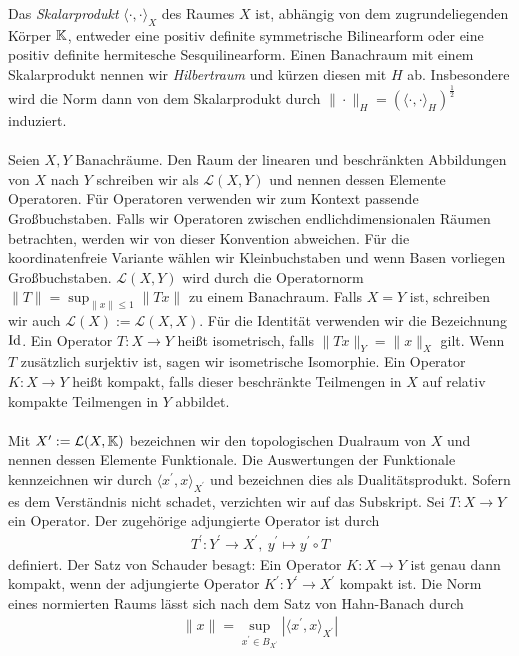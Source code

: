 Das \textit{Skalarprodukt} $ \langle \cdot, \cdot \rangle_X $ des Raumes $ X $ ist, abhängig von dem zugrundeliegenden Körper $ \mathbb{K} $, entweder eine positiv definite symmetrische Bilinearform oder eine positiv definite hermitesche Sesquilinearform.
Einen Banachraum mit einem Skalarprodukt nennen wir \textit{Hilbertraum} und kürzen diesen mit $ H $ ab. Insbesondere wird die Norm dann von dem Skalarprodukt durch $ \| \cdot \|_H = (\langle \cdot , \cdot \rangle_H)^\frac{1}{2} $ induziert.\\
\\
Seien $ X,Y $ Banachräume.
Den Raum der linearen und beschränkten Abbildungen von $ X $ nach $ Y $ schreiben wir als $ \mathcal{L}(X,Y) $ und nennen dessen Elemente Operatoren.
Für Operatoren verwenden wir zum Kontext passende Großbuchstaben.
Falls wir Operatoren zwischen endlichdimensionalen Räumen betrachten, werden wir von dieser Konvention abweichen. Für die koordinatenfreie Variante wählen wir Kleinbuchstaben und wenn Basen vorliegen Großbuchstaben.
$ \mathcal{L}(X,Y) $ wird durch die Operatornorm $ \|T\| = \sup_{\|x\| \leq 1} \|Tx\| $ zu einem Banachraum.
Falls $ X=Y $ ist, schreiben wir auch $ \mathcal{L}(X) := \mathcal{L}(X,X) $.
Für die Identität verwenden wir die Bezeichnung $ \operatorname{Id} $.
Ein Operator $ T: X \to Y $ heißt isometrisch, falls $ \|Tx\|_Y = \|x \|_X $ gilt.
Wenn $ T $ zusätzlich surjektiv ist, sagen wir isometrische Isomorphie.
Ein Operator $ K : X \to Y $ heißt kompakt, falls dieser beschränkte Teilmengen in $ X $ auf relativ kompakte Teilmengen in $ Y $ abbildet.\\
\\
Mit $ X^\prime := \mathcal{L}(X, \mathbb{K})  $ bezeichnen wir den topologischen Dualraum von $ X $ und nennen dessen Elemente Funktionale.
Die Auswertungen der Funktionale kennzeichnen wir durch $ \langle x^\prime , x \rangle_{X^\prime} $ und bezeichnen dies als Dualitätsprodukt.
Sofern es dem Verständnis nicht schadet, verzichten wir auf das Subskript. 
Sei $ T : X \to Y $ ein Operator.
Der zugehörige adjungierte Operator ist durch
\begin{align*}
	T^\prime : Y^\prime \to X^\prime, \
	y^\prime \mapsto y^\prime \circ T 
\end{align*}
definiert.
Der Satz von Schauder\cite[10.6]{Alt2012} besagt:
Ein Operator $ K : X \to Y $ ist genau dann kompakt, wenn der adjungierte Operator $ K^\prime : Y^\prime  \to X^\prime $ kompakt ist.
Die Norm eines normierten Raums lässt sich nach dem Satz von Hahn-Banach\cite[Abschnitt III.1]{Werner2011} durch
\begin{align*}
	\|x \| = \sup \limits_{x^\prime \in B_{X^\prime} } |\langle x^\prime, x \rangle_{X^\prime}|
\end{align*}
